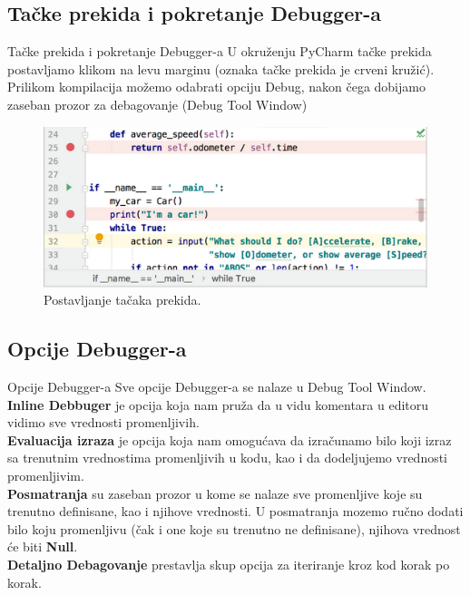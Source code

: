 \documentclass{beamer}
\begin{document}
\subsection{Tačke prekida i pokretanje Debugger-a}
\begin{frame}{Tačke prekida i pokretanje Debugger-a}
U okruženju PyCharm tačke prekida postavljamo klikom na levu marginu (oznaka tačke prekida je crveni kružić).\\
Prilikom kompilacija možemo odabrati opciju Debug, nakon čega dobijamo zaseban prozor za debagovanje (Debug Tool Window)
\begin{figure}[h!]
\begin{center}
\includegraphics[scale = 0.4]{1}
\end{center}
\caption{Postavljanje tačaka prekida.}
\label{1}
\end{figure}
    
\end{frame}
\subsection{Opcije Debugger-a}
\begin{frame}{Opcije Debugger-a}
Sve opcije Debugger-a se nalaze u Debug Tool Window.\\
\textbf{Inline Debbuger} je opcija koja nam pruža da u vidu komentara u editoru vidimo sve vrednosti promenljivih.\\
\textbf{Evaluacija izraza} je opcija koja nam omogućava da izračunamo bilo koji izraz sa trenutnim vrednostima promenljivih u kodu, kao i da dodeljujemo vrednosti promenljivim.\\
\textbf{Posmatranja} su zaseban prozor u kome se nalaze sve promenljive koje su trenutno definisane, kao i njihove vrednosti. U posmatranja mozemo ručno dodati bilo koju promenljivu (čak i one koje su trenutno ne definisane), njihova vrednost će biti \textbf{Null}.\\
\textbf{Detaljno Debagovanje} prestavlja skup opcija za iteriranje kroz kod korak po korak.
\end{frame}
\end{document}
